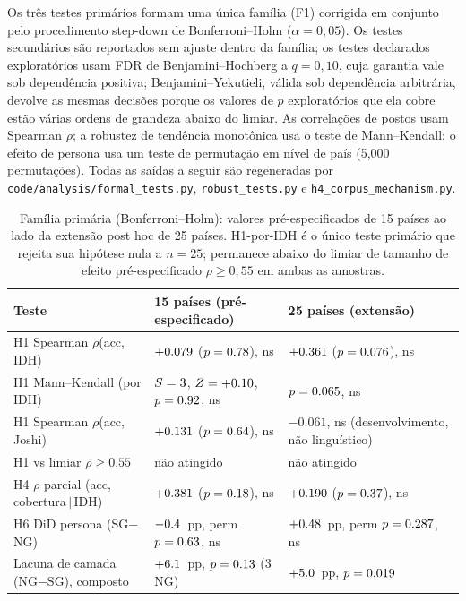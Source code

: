 \documentclass[11pt,a4paper]{article}
\begin{document}
Os três testes primários formam uma única família (F1) corrigida em
conjunto pelo procedimento step-down de Bonferroni--Holm ($\alpha=0,05$). Os testes
secundários são reportados sem ajuste dentro da família; os testes
declarados exploratórios usam FDR de Benjamini--Hochberg a $q=0,10$, cuja
garantia vale sob dependência positiva; Benjamini--Yekutieli, válida sob
dependência arbitrária, devolve as mesmas decisões porque os valores de $p$
exploratórios que ela cobre estão várias ordens de grandeza abaixo do limiar. As
correlações de postos usam Spearman $\rho$; a robustez de tendência monotônica usa
o teste de Mann--Kendall; o efeito de persona usa um teste de permutação em nível
de país (5{,}000 permutações). Todas as saídas a seguir são regeneradas por
\texttt{code/analysis/formal\_tests.py}, \texttt{robust\_tests.py} e
\texttt{h4\_corpus\_mechanism.py}.

\begin{table}[h]\centering
\caption{Família primária (Bonferroni--Holm): valores pré-especificados de 15 países
ao lado da extensão post hoc de 25 países. H1-por-IDH é o único teste
primário que rejeita sua hipótese nula a $n=25$; permanece abaixo do limiar de
tamanho de efeito pré-especificado $\rho\geq 0,55$ em ambas as amostras.}
\label{tab:s-primary}
\small
\begin{tabular}{lll}
\toprule
Teste & 15 países (pré-especificado) & 25 países (extensão) \\
\midrule
H1 Spearman $\rho$(acc, IDH)        & $+0.079$ ($p=0.78$), ns            & $+0.361$ ($p=0.076$), ns \\
H1 Mann--Kendall (por IDH)          & $S=3$, $Z=+0.10$, $p=0.92$, ns     & $p=0.065$, ns \\
H1 Spearman $\rho$(acc, Joshi)      & $+0.131$ ($p=0.64$), ns                      & $-0.061$, ns (desenvolvimento, não linguístico) \\
H1 vs limiar $\rho\geq 0.55$        & não atingido                       & não atingido \\
H4 $\rho$ parcial (acc, cobertura$\,\vert\,$IDH) & $+0.381$ ($p=0.18$), ns & $+0.190$ ($p=0.37$), ns \\
H6 DiD persona (SG$-$NG)            & $-0.4$~pp, perm $p=0.63$, ns & $+0.48$~pp, perm $p=0.287$, ns \\
Lacuna de camada (NG$-$SG), composto & $+6.1$~pp, $p=0.13$ (3 NG)        & $+5.0$~pp, $p=0.019$ \\
\bottomrule
\end{tabular}
\end{table}
\end{document}
